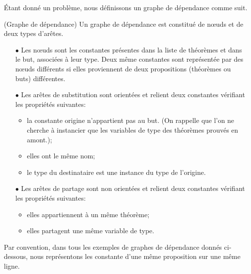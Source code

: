 Étant donné un problème, nous définissons un graphe de dépendance comme suit.
\begin{mydef} (Graphe de dépendance)
Un graphe de dépendance est constitué de nœuds et de deux types
d'arêtes.
\begin{enumerate}
\item[$\bullet$] Les nœuds sont les constantes présentes dans la liste
  de théorèmes et dans le but, associées à leur type. Deux même
  constantes sont représentée par des nœuds différents si elles
  proviennent de deux propositions (théorèmes ou buts) différentes.
\item[$\bullet$] Les arêtes de {\color{blue}substitution} sont orientées
  et relient deux
  constantes vérifiant les propriétés suivantes:
  \begin{itemize}
  \item la constante origine n'appartient pas au but. (On rappelle que
    l'on ne cherche à instancier que les variables de type des théorèmes
    prouvés en amont.);
  \item elles ont le même nom;
  \item le type du destinataire est une instance du type de l'origine.
  \end{itemize}
\item[$\bullet$] Les arêtes de {\color{green}partage} sont non
  orientées et relient deux constantes
  vérifiant les propriétés suivantes:
  \begin{itemize}
  \item elles appartiennent à un même théorème;
  \item elles partagent une même variable de type.
  \end{itemize}
\end{enumerate}
\end{mydef}

Par convention, dans tous les exemples de graphes de dépendance donnés
ci-dessous, nous représentons les constante d'une même proposition sur
une même ligne.

